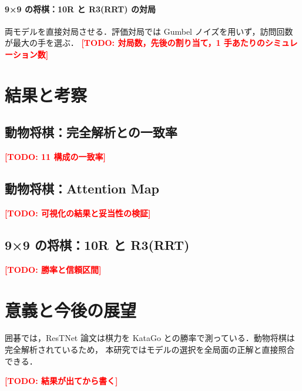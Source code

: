 \documentclass[a4paper,10pt,twocolumn]{ltjsarticle}
\newcommand{\todo}[1]{\textcolor{red}{\textbf{[TODO: #1]}}}
\begin{document}
\paragraph{9×9 の将棋：10R と R3(RRT) の対局}
両モデルを直接対局させる．評価対局では Gumbel ノイズを用いず，訪問回数が最大の手を選ぶ．
\todo{対局数，先後の割り当て，1 手あたりのシミュレーション数}

\section{結果と考察}
\subsection{動物将棋：完全解析との一致率}
\todo{11 構成の一致率}

\subsection{動物将棋：Attention Map}
\todo{可視化の結果と妥当性の検証}

\subsection{9×9 の将棋：10R と R3(RRT)}
\todo{勝率と信頼区間}

\section{意義と今後の展望}
囲碁では，ResTNet 論文は棋力を KataGo との勝率で測っている．動物将棋は完全解析されているため，
本研究ではモデルの選択を全局面の正解と直接照合できる．

\todo{結果が出てから書く}
\end{document}
